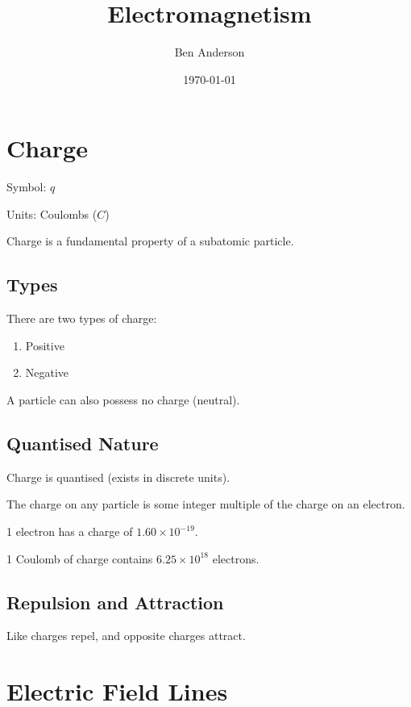\documentclass[a4paper,11pt]{article}
\begin{document}
\title{Electromagnetism}
\author{Ben Anderson}
\date{\today}
\maketitle
\pagebreak

\tableofcontents
\pagebreak


\section{Charge}

Symbol: $q$

Units: Coulombs ($C$)

Charge is a fundamental property of a subatomic particle.


\subsection{Types}

There are two types of charge:

\begin{enumerate}
\item Positive
\item Negative
\end{enumerate}

A particle can also possess no charge (neutral).


\subsection{Quantised Nature}

Charge is quantised (exists in discrete units).

The charge on any particle is some integer multiple of the charge on an
electron.

1 electron has a charge of $1.60 \times 10^{-19}$.

1 Coulomb of charge contains $6.25 \times 10^{18}$ electrons.


\subsection{Repulsion and Attraction}

Like charges repel, and opposite charges attract.




\section{Electric Field Lines}
\end{document}
